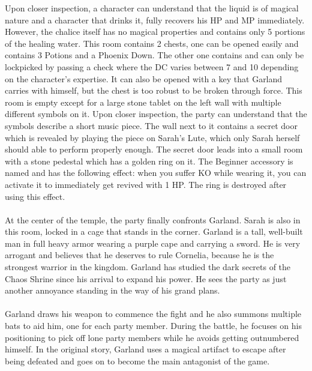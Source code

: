 Upon closer inspection, a character can understand that the liquid is of magical nature and a character that drinks it, fully recovers his HP and MP immediately.
However, the chalice itself has no magical properties and contains only 5 portions of the healing water.
%
\ofpar
%
 This room contains 2 chests, one can be opened easily and contains 3 Potions and a Phoenix Down.
The other one contains  and can only be lockpicked by passing a check where the DC varies between 7 and 10 depending on the character's expertise.
It can also be opened with a key that Garland carries with himself, but the chest is too robust to be broken through force.
%
\ofpar
%
 This room is empty except for a large stone tablet on the left wall with multiple different symbols on it.
Upon closer inspection, the party can understand that the symbols describe a short music piece. 
The wall next to it contains a secret door which is revealed by playing the piece on Sarah's Lute, which only Sarah herself should able to perform properly enough.
The secret door leads into a small room with a stone pedestal which has a golden ring on it.
The Beginner accessory is named  and has the following effect: when you suffer KO while wearing it, you can activate it to immediately get revived with 1 HP. The ring is destroyed after using this effect.
%
\clearpage
%
\\\\
%
 At the center of the temple, the party finally confronts Garland.
Sarah is also in this room, locked in a cage that stands in the corner. 
Garland is a tall, well-built man in full heavy armor wearing a purple cape and carrying a sword.
He is very arrogant and believes that he deserves to rule Cornelia, because he is the strongest warrior in the kingdom.
Garland has studied the dark secrets of the Chaos Shrine since his arrival to expand his power.
He sees the party as just another annoyance standing in the way of his grand plans.
%
\vfill
%
\\\\
%
Garland draws his weapon to commence the fight and he also summons multiple bats to aid him, one for each party member.
During the battle, he focuses on his positioning to pick off lone party members while he avoids getting outnumbered himself.
In the original story, Garland uses a magical artifact to escape after being defeated and goes on to become the main antagonist of the game.
